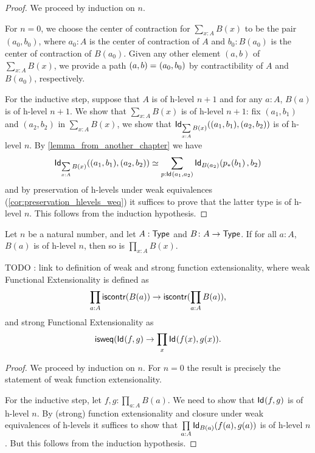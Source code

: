 \begin{proof}
 We proceed by induction on $n$.
 
 For $n = 0$, we choose the center of contraction for $\sum\limits_{x : A} B(x)$ to be the pair
       $(a_0, b_0)$, where $a_0 : A$ is the center of contraction of $A$ and $b_0 : B(a_0)$ is the center of contraction of $B(a_0)$.
       Given any other element $(a,b)$ of $\sum\limits_{x : A} B(x)$, we provide a path $\id{(a, b)}{(a_0,b_0)}$
       by contractibility of $A$ and $B(a_0)$, respectively.
 
 For the inductive step, suppose that $A$ is of h-level $n+1$ and
         for any $a : A$, $B(a)$ is of h-level $n + 1$. We show that $\sum\limits_{x : A} B(x)$ is
         of h-level $n + 1$:
      fix $(a_1, b_1)$ and $(a_2,b_2)$ in $\sum\limits_{x : A} B(x)$,
     we show that $\idtype[\sum\limits_{x : A} B(x)]{(a_1, b_1)}{(a_2,b_2)}$ is of h-level $n$.
      By \autoref{lemma_from_another_chapter} we have
      \[ \eqv{\idtype[\sum\limits_{x : A} B(x)]{(a_1, b_1)}{(a_2,b_2)}}{\sum_{p : \idtype{a_1}{a_2}} \idtype[B(a_2)]{\trans{p}{b_1}}{b_2}} \]
   and by preservation of h-levels under weak equivalences (\autoref{cor:preservation_hlevels_weq})
   it suffices to prove that the latter type is of h-level $n$. This follows from the
   induction hypothesis.
\end{proof}


\begin{thm}
 Let $n$ be a natural number, and let $A : \type$ and $B \colon A \to \type$.
     If for all $a : A$, $B(a)$ is of h-level $n$, then so is $\prod\limits_{x : A} B(x)$.
\end{thm}

TODO : link to definition of weak and strong function extensionality, where
weak Functional Extensionality is defined as
\[ \prod_{a : A} \iscontr (B(a)) \to \iscontr (\prod_{a : A} B(a)), \]
and strong Functional Extensionality as
\[ \isweq (\idtype{f}{g} \to \prod_x \idtype{f(x)}{g(x)}. \]

\begin{proof}
 We proceed by induction on $n$. For $n = 0$ the result is precisely the statement of weak function extensionality.
 
 For the inductive step, let $f, g : \prod\limits_{a:A}B(a)$. We need to show that
      $\idtype{f}{g}$ is of h-level $n$. By (strong) function extensionality and closure
      under weak equivalences of h-levels it suffices to show that
      $\prod\limits_{a : A} \idtype[B(a)]{f(a)}{g(a)}$ is of h-level $n$. But this follows from the
      induction hypothesis.
\end{proof}


